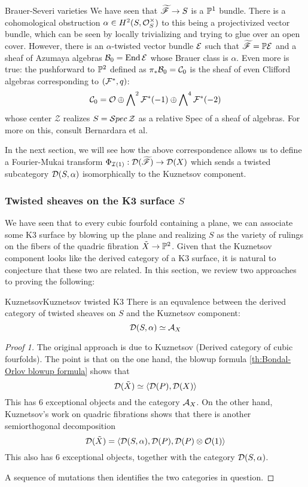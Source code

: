 \begin{remark}{Brauer-Severi varieties}{}
    We have seen that $\tscrF\rightarrow S$ is a $\P^1$ bundle. There is a cohomological obstruction $\alpha \in H^2(S, \O_S^\times)$ to this being a projectivized vector bundle, which can be seen by locally trivializing and trying to glue over an open cover. However, there is an $\alpha$-twisted vector bundle $\calE$ such that $\tscrF=\P \calE$ and a sheaf of Azumaya algebras $\calB_0 = \mathrm{End}\,\calE$ whose Brauer class is $\alpha$.  Even more is true: the pushforward to $\P^2$ defined as $\pi_* \calB_0 = \calC_0$ is the sheaf of even Clifford algebras corresponding to $(\calF^*, q)$: $$\calC_0=\O \oplus \bigwedge\nolimits^2 \calF^*(-1)\oplus \bigwedge\nolimits^4\calF^*(-2)$$ whose center $\mathcal{Z}$ realizes $S=\calS pec\, \mathcal{Z}$ as a relative Spec of a sheaf of algebras. For more on this, consult Bernardara et al.
    
\end{remark}

In the next section, we will see how the above correspondence allows us to define a Fourier-Mukai transform $\Phi_{\calI(1)}: \calD (\tscrF)\rightarrow \calD (X)$ which sends a twisted subcategory $\calD(S,\alpha)$ isomorphically to the Kuznetsov component.

\subsubsection{Twisted sheaves on the K3 surface \texorpdfstring{$S$}{S}}

We have seen that to every cubic fourfold containing a plane, we can associate some K3 surface by blowing up the plane and realizing $S$ as the variety of rulings on the fibers of the quadric fibration $\tilde{X}\rightarrow \P^2$. Given that the Kuznetsov component looks like the derived category of a K3 surface, it is natural to conjecture that these two are related. In this section, we review two approaches to proving the following: 
\begin{proposition}{Kuznetsov}{Kuznetsov twisted K3}
    There is an equvalence between the derived category of twisted sheaves on $S$ and the Kuznetsov component: $$\calD(S,\alpha)\simeq \calA_X$$
\end{proposition}

\begin{proof}[Proof 1]
    The original approach is due to Kuznetsov (Derived category of cubic fourfolds). The point is that on the one hand, the blowup formula \ref{th:Bondal-Orlov blowup formula} shows that $$\calD(\tilde{X})\simeq \langle \calD(P), \calD(X)  \rangle $$
    This has $6$ exceptional objects and the category $\calA_X$.
    On the other hand, Kuznetsov's work on quadric fibrations shows that there is another semiorthogonal decomposition $$\calD(\tilde{X})=\langle \calD(S,\alpha), \calD(P), \calD(P) \otimes \O(1)\rangle$$
    This also has $6$ exceptional objects, together with the category $\calD(S,\alpha)$.

    A sequence of mutations then identifies the two categories in question.
\end{proof}

